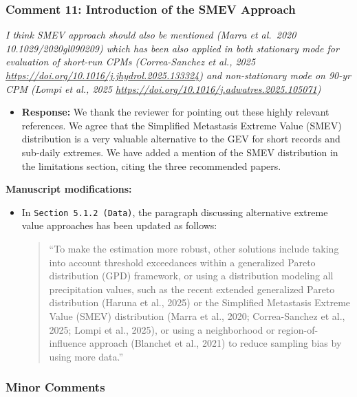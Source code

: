 \documentclass[
  letterpaper,
  DIV=11,
  numbers=noendperiod]{scrartcl}
\providecommand{\tightlist}{%
  \setlength{\itemsep}{0pt}\setlength{\parskip}{0pt}}\usepackage{longtable,booktabs,array}
\begin{document}
\subsubsection{Comment 11: Introduction of the SMEV
Approach}\label{comment-11-introduction-of-the-smev-approach}

\emph{I think SMEV approach should also be mentioned (Marra et al.~2020
10.1029/2020gl090209) which has been also applied in both stationary
mode for evaluation of short-run CPMs (Correa-Sanchez et al., 2025
\url{https://doi.org/10.1016/j.jhydrol.2025.133324}) and non-stationary
mode on 90-yr CPM (Lompi et al., 2025
\url{https://doi.org/10.1016/j.adwatres.2025.105071})}

\begin{itemize}
\tightlist
\item
  \textbf{Response:} We thank the reviewer for pointing out these highly
  relevant references. We agree that the Simplified Metastasis Extreme
  Value (SMEV) distribution is a very valuable alternative to the GEV
  for short records and sub-daily extremes. We have added a mention of
  the SMEV distribution in the limitations section, citing the three
  recommended papers.
\end{itemize}

\textbf{Manuscript modifications:}

\begin{itemize}
\item
  In \texttt{Section\ 5.1.2\ (Data)}, the paragraph discussing
  alternative extreme value approaches has been updated as follows:

  \begin{quote}
  ``To make the estimation more robust, other solutions include taking
  into account threshold exceedances within a generalized Pareto
  distribution (GPD) framework, or using a distribution modeling all
  precipitation values, such as the recent extended generalized Pareto
  distribution (Haruna et al., 2025) or the Simplified Metastasis
  Extreme Value (SMEV) distribution (Marra et al., 2020; Correa-Sanchez
  et al., 2025; Lompi et al., 2025), or using a neighborhood or
  region-of-influence approach (Blanchet et al., 2021) to reduce
  sampling bias by using more data.''
  \end{quote}
\end{itemize}

\subsubsection{Minor Comments}\label{minor-comments}
\end{document}
